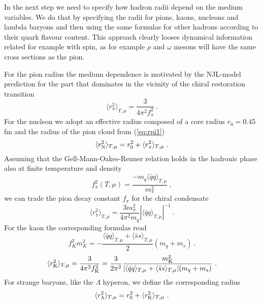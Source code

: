 \documentclass[12pt]{article}
\begin{document}
In the next step we need to specify how hadron radii depend on the medium variables.
We do that by specifying the radii for pions, kaons, nucleons and lambda baryons and then using the 
same formulas for other hadrons according to their quark flavour content. 
This approach clearly looses dynamical information related for example with spin, as for example 
$\rho$ and $\omega$ mesons will have the same cross sections as the pion.

For the pion radius the medium dependence  is motivated by the NJL-model prediction 
\cite{Hippe:1995hu} for the part that dominates in the vicinity of the chiral restoration transition
%
\begin{equation}
\langle r^2_{\pi} \rangle_{T,\mu}=\frac{3}{4\pi^2 f_{\pi}^2}~.
\label{eq:rpi1}
\end{equation} 
%
For the nucleon we adopt an effective radius composed of a core radius $r_0=0.45$ fm and 
the radius of the pion cloud from (\ref{eq:rpi1})
%
\begin{equation}
\langle r^2_{\rm N} \rangle_{T,\mu} = r_0^2 + \langle r_{\pi}^2\rangle_{T,\mu}~.
\label{eq:}
\end{equation}
%
Assuming that the Gell-Mann-Oakes-Renner relation holds in the hadronic phase also at finite 
temperature and density 
%
\begin{equation}
f_{\pi}^2(T,\mu) = \frac{-m_q\langle \bar q q \rangle_{T,\mu}}{m_{\pi}^2}~,
\label{eq:GMORpi}
\end{equation}
%
we can trade the pion decay constant $f_\pi$ for the chiral condensate
%
\begin{equation}
\langle r^2_{\pi}\rangle_{T,\mu}=\frac{3m_{\pi}^2}{4\pi^2 m_q}|\langle \bar q q \rangle_{T,\mu}|^{-1}~.
\label{eq:}
\end{equation}
%
For the kaon the corresponding formulas read
%
\begin{equation}
f_K^2m_K^2 = - \frac{\langle\bar{q}q\rangle_{T,\mu} + \langle\bar{s}s\rangle_{T,\mu}}{2}(m_q+m_s)~.
\label{eq:GMORkaon}
\end{equation}
% 
%
\begin{equation}
\langle r^2_{\rm K} \rangle_{T,\mu} =\frac{3}{4\pi^2 f_{\rm K}^2} 
=
\frac{3}{2\pi^2}\frac{m_{\rm K}^2}{|\langle\bar{q}q\rangle_{T,\mu} + \langle\bar{s}s\rangle_{T,\mu}|(m_q+m_s)} ~.
\label{eq:rpi1}
\end{equation} 
%
For strange baryons, like the $\Lambda$ hyperon, we define the corresponding radius
%
\begin{equation}
\langle r_\Lambda^2\rangle_{T,\mu} = r_0^2 + \langle r_{\rm K}^2\rangle_{T,\mu}~.
\label{eq:}
\end{equation}
\end{document}
